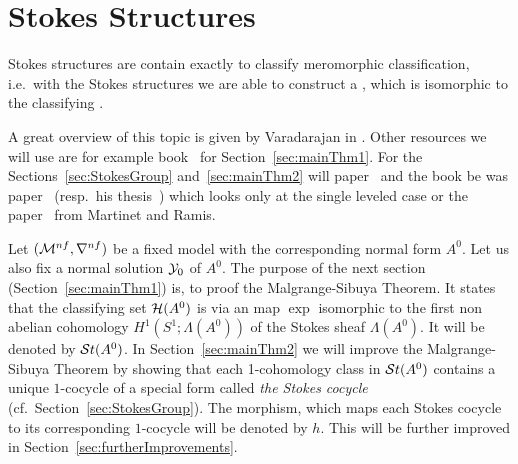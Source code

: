 \chapter{Stokes Structures}\label{chap:stokes}
Stokes structures are contain exactly  to
classify meromorphic classification, i.e.\ with the Stokes structures we are
able to construct a , which is isomorphic to
the classifying .

A great overview of this topic is given by Varadarajan in
\cite{Varadarajan96linearmeromorphic}. Other resources we will use are for
example  book~\cite[section II]{sabbah2007isomonodromic} for
Section~\ref{sec:mainThm1}.
For the Sections~\ref{sec:StokesGroup} and~\ref{sec:mainThm2} will
 paper~\cite{Loday1994} and the book
\cite[Sec.4]{Loday2014} be  was 
paper~\cite{boalch} (resp.\ his thesis~\cite{thboalch}) which looks only at the
single leveled case or the paper~\cite[Thm.13]{Martinet1991} from Martinet and
Ramis.

Let $(\mathcal{M}^{nf},\nabla^{nf})$ be a fixed model with the corresponding normal
form $A^0$.
Let us also fix a normal solution $\mathcal{Y}_0$ of $A^0$.
The purpose of the next section (Section~\ref{sec:mainThm1}) is, to proof the
Malgrange-Sibuya Theorem.
It states that the classifying set $\mathcal{H}(A^0)$ is via an map $\exp$ isomorphic
to the first non abelian cohomology $H^1(S^1;\Lambda(A^0))$ of the Stokes sheaf
$\Lambda(A^0)$. It will be denoted by $\mathcal{S}{}t(A^0)$.
In Section~\ref{sec:mainThm2} we will improve the Malgrange-Sibuya Theorem by
showing that each 1-cohomology class in $\mathcal{S}{}t(A^0)$ contains a unique
$1$-cocycle of a special form called \emph{the Stokes cocycle}
(cf.\ Section~\ref{sec:StokesGroup}).
The morphism, which maps each Stokes cocycle to its corresponding $1$-cocycle
will be denoted by $h$.
This will be further improved in Section~\ref{sec:furtherImprovements}.

